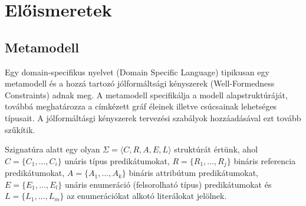 \chapter{Előismeretek}

\section{Metamodell}

Egy domain-specifikus nyelvet (Domain Specific Language) tipikusan egy metamodell és a hozzá tartozó jólformáltsági kényszerek (Well-Formedness Constraints) adnak meg. A metamodell specifikálja a modell alapstruktúráját, továbbá meghatározza a címkézett gráf  éleinek illetve csúcsainak lehetséges típusait. A jólformáltásgi kényszerek tervezési szabályok hozzáadásával ezt tovább szűkítik.

\begin{definition}[Szignatúra]
Szignatúra alatt egy olyan $\Sigma = \langle\mathit{C}, \mathit{R}, \mathit{A}, \mathit{E}, \mathit{L}\rangle$ struktúrát értünk, ahol $C = \{C_1, \ldots, C_i\}$ unáris típus predikátumokat, $R = \{R_1, \ldots, R_j\}$ bináris referencia predikátumokat, $A = \{A_1, \ldots, A_k\}$ bináris attribútum predikátumokat, $E = \{E_1, \ldots, E_l\}$ unáris enumeráció (felsorolható típus) predikátumokat és $L = \{L_1, \ldots, L_m\}$ az enumerációkat alkotó literálokat jelölnek.
\end{definition}


